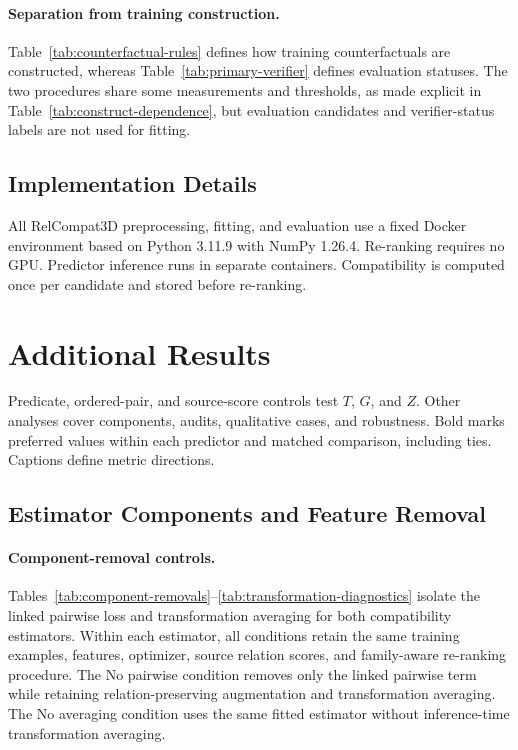 \paragraph{Separation from training construction.}
Table~\ref{tab:counterfactual-rules} defines how training counterfactuals are constructed, whereas Table~\ref{tab:primary-verifier} defines evaluation statuses. The two procedures share some measurements and thresholds, as made explicit in Table~\ref{tab:construct-dependence}, but evaluation candidates and verifier-status labels are not used for fitting.

\subsection{Implementation Details}

All RelCompat3D preprocessing, fitting, and evaluation use a fixed Docker environment based on Python 3.11.9 with NumPy 1.26.4. Re-ranking requires no GPU. Predictor inference runs in separate containers. Compatibility is computed once per candidate and stored before re-ranking.

\section{Additional Results}

Predicate, ordered-pair, and source-score controls test $T$, $G$, and $Z$. Other analyses cover components, audits, qualitative cases, and robustness. Bold marks preferred values within each predictor and matched comparison, including ties. Captions define metric directions.

\subsection{Estimator Components and Feature Removal}
\paragraph{Component-removal controls.}
Tables~\ref{tab:component-removals}--\ref{tab:transformation-diagnostics} isolate the linked pairwise loss and transformation averaging for both compatibility estimators. Within each estimator, all conditions retain the same training examples, features, optimizer, source relation scores, and family-aware re-ranking procedure. The No pairwise condition removes only the linked pairwise term while retaining relation-preserving augmentation and transformation averaging. The No averaging condition uses the same fitted estimator without inference-time transformation averaging.

